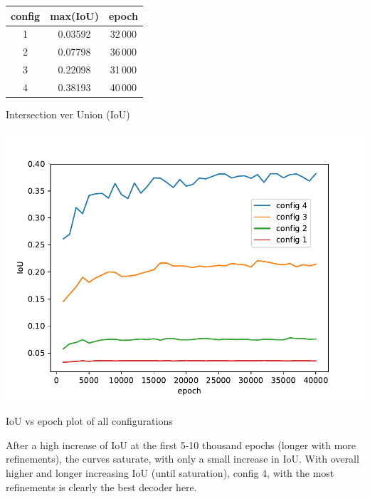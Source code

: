 \documentclass[11pt,a4paper,DIV=14,headinclude=false,footinclude=false]{scrartcl}
\begin{document}
\begin{minipage}{.35\textwidth} \centering
    \captionsetup{type=table,justification=raggedright}
    \begin{tabular}{ccc}\toprule
        config & max(IoU) & epoch \\ \midrule
        1 & 0.03592 & 32\,000\\
        2 & 0.07798 & 36\,000\\
        3 & 0.22098 & 31\,000\\
        4 & 0.38193 & 40\,000\\ \bottomrule
    \end{tabular}
    \caption{Intersection ver Union (IoU)}\label{tab:maxIoU}
\end{minipage}\hfill
\begin{minipage}{.65\textwidth} \centering
    \captionsetup{type=figure}
    \includegraphics[width=\linewidth,keepaspectratio,clip,trim=0 0 30px 20px]{plots/configs.pdf}
    \caption{IoU vs epoch plot of all configurations}
    \label{fig:all}
\end{minipage}

\noindent After a high increase of IoU at the first 5-10 thousand epochs (longer with more refinements), the curves saturate, with only a small increase in IoU. With overall higher and longer increasing IoU (until saturation), config 4, with the most refinements is clearly the best decoder here.
\end{document}
